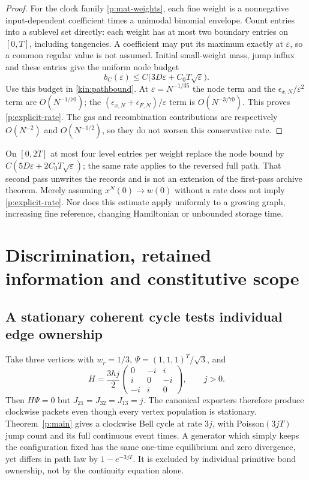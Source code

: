 \documentclass[11pt,oneside,openany]{book}
\theoremstyle{definition}
\theoremstyle{remark}\newtheorem{remark}[theorem]{Remark}
\begin{document}
\begin{proof}
For the clock family \eqref{p:mat-weights}, each fine weight is a
nonnegative input-dependent coefficient times a unimodal binomial
envelope.  Count entries into a sublevel set directly: each weight has
at most two boundary entries on $[0,T]$, including tangencies.  A
coefficient may put its maximum exactly at $\varepsilon$, so a common
regular value is not assumed.  Initial small-weight mass, jump influx
and these entries give the uniform node budget
\[
 b_C(\varepsilon)\le C\bigl(3D\varepsilon+C_0T\sqrt\varepsilon\bigr).
\]
Use this budget in \eqref{kin:pathbound}.  At
$\varepsilon=N^{-1/35}$ the node term and the
$\epsilon_{x,N}/\varepsilon^2$ term are $O(N^{-1/70})$; the
$ (\epsilon_{x,N}+\epsilon_{F,N})/\varepsilon$ term is
$O(N^{-3/70})$.  This proves \eqref{p:explicit-rate}.
The gas and recombination contributions are respectively $O(N^{-2})$
and $O(N^{-1/2})$, so they do not worsen this conservative rate.
\end{proof}

On $[0,2T]$ at most four level entries per weight replace the node bound
by $C(5D\varepsilon+2C_0T\sqrt\varepsilon)$; the same rate applies to
the reversed full path.  That second pass unwrites the records and is
not an extension of the first-pass archive theorem.  Merely assuming
$x^N(0)\to w(0)$ without a rate does not imply
\eqref{p:explicit-rate}.  Nor does this estimate apply uniformly to a
growing graph, increasing fine reference, changing Hamiltonian or unbounded
storage time.

\chapter{Discrimination, retained information and constitutive scope}\label{p:chapter-discrimination}\label{p:sec-rivals}
\section{A stationary coherent cycle tests individual edge ownership}
Take three vertices with $w_r=1/3$, $\Psi=(1,1,1)^T/\sqrt3$, and
\[
 H=\frac{3\hbar j}{2}
 \begin{pmatrix}0&-i&i\\i&0&-i\\-i&i&0\end{pmatrix},\qquad j>0.
\]
Then $H\Psi=0$ but $J_{21}=J_{32}=J_{13}=j$. The canonical exporters therefore produce clockwise packets even though every vertex population is stationary. Theorem~\ref{p:main} gives a clockwise Bell cycle at rate $3j$, with Poisson$(3jT)$ jump count and its full continuous event times. A generator which simply keeps the configuration fixed has the same one-time equilibrium and zero divergence, yet differs in path law by $1-e^{-3jT}$. It is excluded by individual primitive bond ownership, not by the continuity equation alone.
\end{document}
